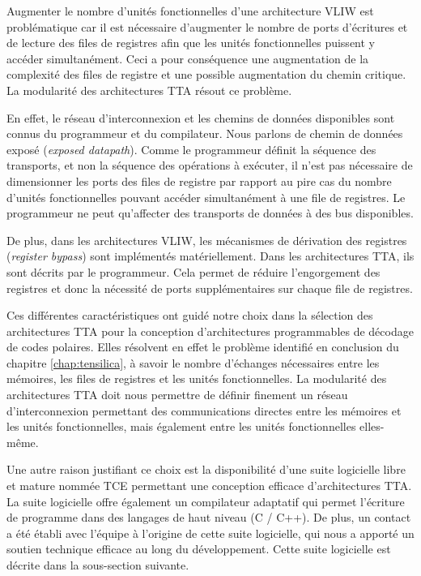 Augmenter le nombre d'unités fonctionnelles d'une architecture VLIW est problématique car il est nécessaire d'augmenter le nombre de ports d'écritures et de lecture des files de registres afin que les unités fonctionnelles puissent y accéder simultanément. Ceci a pour conséquence une augmentation de la complexité des files de registre et une possible augmentation du chemin critique.
La modularité des architectures TTA résout ce problème.

En effet, le réseau d'interconnexion et les chemins de données disponibles sont connus du programmeur et du compilateur. Nous parlons de \og chemin de données exposé \fg (\textit{exposed datapath}). Comme le programmeur définit la séquence des transports, et non la séquence des opérations à exécuter, il n'est pas nécessaire de dimensionner les ports des files de registre par rapport au pire cas du nombre d'unités fonctionnelles pouvant accéder simultanément à une file de registres. Le programmeur ne peut qu'affecter des transports de données à des bus disponibles.

De plus, dans les architectures VLIW, les mécanismes de dérivation des registres (\textit{register bypass}) sont implémentés matériellement. Dans les architectures TTA, ils sont décrits par le programmeur. Cela permet de réduire l'engorgement des registres et donc la nécessité de ports supplémentaires sur chaque file de registres.

Ces différentes caractéristiques ont guidé notre choix dans la sélection des architectures TTA pour la conception d'architectures programmables de décodage de codes polaires. Elles résolvent en effet le problème identifié en conclusion du chapitre \ref{chap:tensilica}, à savoir le nombre d'échanges nécessaires entre les mémoires, les files de registres et les unités fonctionnelles. La modularité des architectures TTA doit nous permettre de définir finement un réseau d'interconnexion permettant des communications directes entre les mémoires et les unités fonctionnelles, mais également entre les unités fonctionnelles elles-même.

Une autre raison justifiant ce choix est la disponibilité d'une suite logicielle libre et mature nommée TCE permettant une conception efficace d'architectures TTA. La suite logicielle offre également un compilateur adaptatif qui permet l'écriture de programme dans des langages de haut niveau (C / C++). De plus, un contact a été établi avec l'équipe à l'origine de cette suite logicielle, qui nous a apporté un soutien technique efficace au long du développement. Cette suite logicielle est décrite dans la sous-section suivante.


